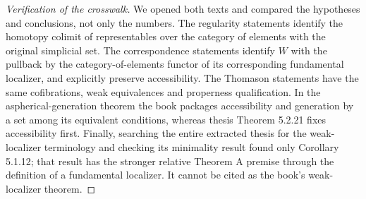 \begin{proof}[Verification of the crosswalk]
We opened both texts and compared the hypotheses and conclusions, not
only the numbers.  The regularity statements identify the homotopy colimit
of representables over the category of elements with the original
simplicial set.  The correspondence statements identify $W$ with the
pullback by the category-of-elements functor of its corresponding
fundamental localizer, and explicitly preserve accessibility.  The Thomason
statements have the same cofibrations, weak equivalences and properness
qualification.  In the aspherical-generation theorem the book packages
accessibility and generation by a set among its equivalent conditions,
whereas thesis Theorem 5.2.21 fixes accessibility first.  Finally, searching
the entire extracted thesis for the weak-localizer terminology and checking
its minimality result found only Corollary 5.1.12; that result has the stronger
relative Theorem A premise through the definition of a fundamental
localizer.  It cannot be cited as the book's weak-localizer theorem.
\end{proof}

